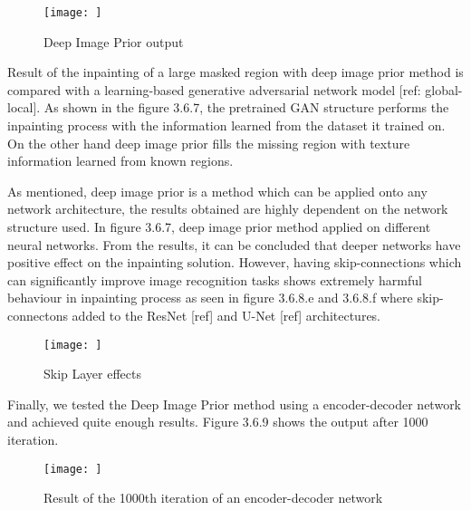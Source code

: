 \begin{figure}[h]
    \centering
    \texttt{[image: ]}
    \caption{Deep Image Prior output}
    \label{fig:my_label}
\end{figure}

Result of the inpainting of a large masked region with deep image prior method is compared with a learning-based generative adversarial network model [ref: global-local]. As shown in the figure 3.6.7, the pretrained GAN structure performs the inpainting process with the information learned from the dataset it trained on. On the other hand deep image prior fills the missing region with texture information learned from known regions.

As mentioned, deep image prior is a method which can be applied onto any network architecture, the results obtained are highly dependent on the network structure used. In figure 3.6.7, deep image prior method applied on different neural networks. From the results, it can be concluded that deeper networks have positive effect on the inpainting solution. However, having skip-connections which can significantly improve image recognition tasks shows extremely harmful behaviour in inpainting process as seen in figure 3.6.8.e and 3.6.8.f where skip-connectons added to the ResNet [ref] and U-Net [ref] architectures.

\begin{figure}[h]
    \centering
    \texttt{[image: ]}
    \caption{Skip Layer effects}
    \label{fig:my_label}
\end{figure}

Finally, we tested the Deep Image Prior method using a encoder-decoder network and achieved quite enough results. Figure 3.6.9 shows the output after 1000 iteration.

\begin{figure}[h]
    \centering
    \texttt{[image: ]}
    \caption{Result of the 1000th iteration of an encoder-decoder network}
    \label{fig:my_label}
\end{figure}